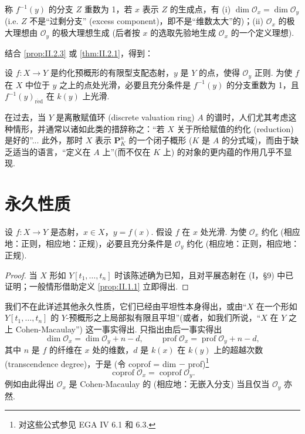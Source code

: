 称 $f^{-1}(y)$ 的分支 $Z$ 重数为 1，若 $x$ 表示 $Z$ 的生成点，有 (i) $\dim \mathcal{O}_x = \dim \mathcal{O}_y$ (i.e. $Z$ 不是``过剩分支'' (excess component)，即不是``维数太大''的)；(ii) $\mathcal{O}_x$ 的极大理想由 $\mathcal{O}_y$ 的极大理想生成 (后者按 $x$ 的选取先验地生成 $\mathcal{O}_x$ 的一个定义理想).

结合 \ref{prop:II.2.3} 或 \ref{thm:II.2.1}，得到：

\begin{corollary}\label{cor:II.2.6}
设 $f \colon X \to Y$ 是约化预概形的有限型支配态射，$y$ 是 $Y$ 的点，使得 $\mathcal{O}_y$ 正则. 为使 $f$ 在 $X$ 中位于 $y$ 之上的点处光滑，必要且充分条件是 $f^{-1}(y)$ 的分支重数为 1，且 $f^{-1}(y)_{\mathrm{r\acute{e}d}}$ 在 $k(y)$ 上光滑.
\end{corollary}

在过去，当 $Y$ 是离散赋值环 (discrete valuation ring) $A$ 的谱时，人们尤其考虑这种情形，并通常以诸如此类的措辞称之：``若 $X$ 关于所给赋值的约化 (reduction) 是好的''... 此外，那时 $X$ 表示 $\mathbf{P}_K^n$ 的一个闭子概形 ($K$ 是 $A$ 的分式域)，而由于缺乏适当的语言，``定义在 $A$ 上''(而不仅在 $K$ 上) 的对象的更内蕴的作用几乎不显现.

\section{永久性质}

\begin{proposition}\label{prop:II.3.1}
设 $f \colon X \to Y$ 是态射，$x \in X$，$y = f(x)$. 假设 $f$ 在 $x$ 处光滑. 为使 $\mathcal{O}_x$ 约化 (相应地：正则，相应地：正规)，必要且充分条件是 $\mathcal{O}_y$ 约化 (相应地：正则，相应地：正规).
\end{proposition}

\begin{proof}
当 $X$ 形如 $Y[t_1, \dots, t_n]$ 时该陈述确为已知，且对平展态射在 (I，§9) 中已证明；一般情形借助定义 \ref{prop:II.1.1} 立即得出.
\end{proof}

我们不在此详述其他永久性质，它们已经由平坦性本身得出，或由``$X$ 在一个形如 $Y[t_1, \dots, t_n]$ 的 $Y$-预概形之上局部拟有限且平坦''(或者，如我们所说，``$X$ 在 $Y$ 之上 Cohen-Macaulay'') 这一事实得出. 只指出由后一事实得出
\begin{equation}
\dim \mathcal{O}_x = \dim \mathcal{O}_y + n - d, \qquad \operatorname{prof} \mathcal{O}_x = \operatorname{prof} \mathcal{O}_y + n - d, \tag{3.1}
\label{eq:II.3.1}
\end{equation}
其中 $n$ 是 $f$ 的纤维在 $x$ 处的维数，$d$ 是 $k(x)$ 在 $k(y)$ 上的超越次数 (transcendence degree)，于是 (令 coprof = dim $-$ prof)\footnote{对这些公式参见 EGA IV 6.1 和 6.3.}
\begin{equation}
\operatorname{coprof} \mathcal{O}_x = \operatorname{coprof} \mathcal{O}_y. \tag{3.2}
\label{eq:II.3.2}
\end{equation}
例如由此得出 $\mathcal{O}_x$ 是 Cohen-Macaulay 的 (相应地：无嵌入分支) 当且仅当 $\mathcal{O}_y$ 亦然.

